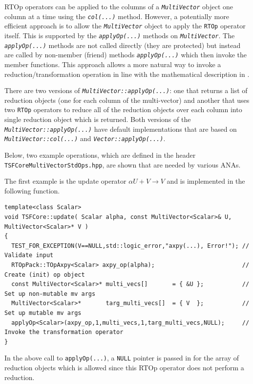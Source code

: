 RTOp operators can be applied to the columns of a
\texttt{\textit{Multi\-Vector}} object one column at a time
using the \texttt{\textit{col(...)}} method.  However, a potentially
more efficient approach is to allow the
\texttt{\textit{Multi\-Vector}} object to apply the \texttt{RTOp} operator itself.
This is supported by the \texttt{\textit{applyOp(\-...)}} methods on
\texttt{\textit{Multi\-Vector}}.  The \texttt{\textit{applyOp(\-...)}} methods are not
called directly (they are protected) but instead are called by
non-member (friend) methods \texttt{\textit{applyOp(\-...)}} which then
invoke the member functions.  This
approach allows a more natural way to invoke a
reduction/transformation operation in line with the mathematical
description in \cite{ref:rtop_toms}.

There are two versions of
\texttt{\textit{Multi\-Vector\-::applyOp(\-...)}}: one that returns a list
of reduction objects (one for each column of the multi-vector) and
another that uses two \texttt{RTOp} operators to reduce all of the
reduction objects over each column into single reduction object which
is returned.  Both versions of the
\texttt{\textit{Multi\-Vector\-::applyOp(\-...)}} have default implementations
that are based on \texttt{\textit{Multi\-Vector\-::col(...)}} and
\texttt{\textit{Vector\-::applyOp(\-...)}}.

Below, two example operations, which are defined in the header
\texttt{TSFCore\-Multi\-Vector\-Std\-Ops.hpp}, are shown that are needed
by various ANAs.

The first example is the update operator $\alpha U + V \rightarrow V$
and is implemented in the following function.

{\scriptsize\begin{verbatim}
template<class Scalar>
void TSFCore::update( Scalar alpha, const MultiVector<Scalar>& U, MultiVector<Scalar>* V )
{
  TEST_FOR_EXCEPTION(V==NULL,std::logic_error,"axpy(...), Error!"); // Validate input
  RTOpPack::TOpAxpy<Scalar> axpy_op(alpha);                         // Create (init) op object
  const MultiVector<Scalar>* multi_vecs[]       = { &U };           // Set up non-mutable mv args
  MultiVector<Scalar>*       targ_multi_vecs[]  = { V  };           // Set up mutable mv args
  applyOp<Scalar>(axpy_op,1,multi_vecs,1,targ_multi_vecs,NULL);     // Invoke the transformation operator
}
\end{verbatim}}

{}\noindent{}In the above call to \texttt{applyOp(\-...)}, a \texttt{NULL} pointer is
passed in for the array of reduction objects which is allowed since
this RTOp operator does not perform a reduction.

